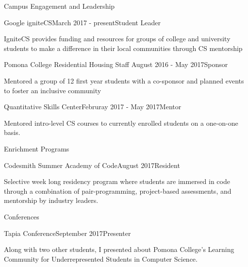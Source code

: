 \documentclass{resume} %
\begin{document}
\begin{rSection}{Campus Engagement and Leadership}

\begin{rSubsection}{Google igniteCS}{March 2017 - present}{Student Leader}
\item IgniteCS provides funding and resources for groups of college and university students to make a difference in their local communities through CS mentorship
\end{rSubsection}


\begin{rSubsection}{Pomona College Residential Housing Staff }{August 2016 - May 2017}{Sponsor}
\item Mentored a group of 12 first year students with a co-sponsor and planned events to foster an inclusive community

\end{rSubsection}


\begin{rSubsection}{Quantitative Skills Center}{Februray 2017 - May 2017}{Mentor}
\item Mentored intro-level CS courses to currently enrolled students on a one-on-one basis.
\end{rSubsection}


\end{rSection}
%
\begin{rSection}{Enrichment Programs}
%
  \begin{rSubsection}{Codesmith Summer Academy of Code}{August 2017}{Resident}
  \item Selective week long residency program where students are immersed in code through a combination of pair-programming, project-based assessments, and mentorship by industry leaders.
  \end{rSubsection}
%
%
\end{rSection}

%
\begin{rSection}{Conferences}
%
  \begin{rSubsection}{Tapia Conference}{September 2017}{Presenter}
  \item Along with two other students, I presented about Pomona College's Learning Community for Underrepresented Students in Computer Science.
  \end{rSubsection}
%
%
\end{rSection}
\end{document}
